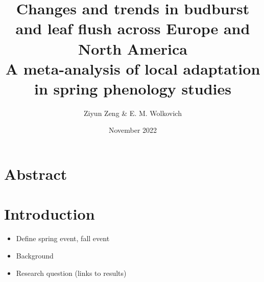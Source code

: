 \documentclass{article}
\begin{document}
\title{{\huge Changes and trends in budburst and leaf flush across Europe and North America} \\A meta-analysis of local adaptation in spring phenology studies}
\author{Ziyun Zeng \& E. M. Wolkovich}
\date{November 2022}
\maketitle 


\newpage

\section*{Abstract}

\section{Introduction}
\begin{itemize}
\item Define spring event, fall event
\item Background 
\item Research question (links to results)
\end{itemize}
\end{document}
